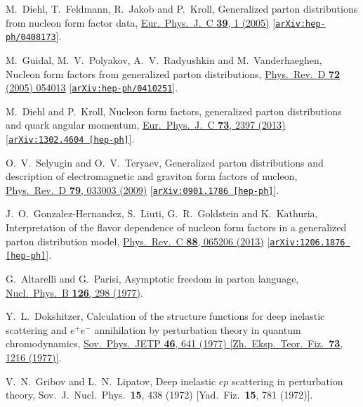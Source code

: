 \documentclass[aps,prl,reprint,groupedaddress, preprintnumbers]{revtex4-1}
\begin{document}
\begin{thebibliography}{50}
  
  M.~Diehl, T.~Feldmann, R.~Jakob and P.~Kroll,
  Generalized parton distributions from nucleon form factor data,
  \href{https://doi.org/10.1140/epjc/s2004-02063-4}{Eur.\ Phys.\ J.\ C {\bf 39}, 1 (2005)}
  [\href{https://arxiv.org/abs/hep-ph/0408173}{\tt arXiv:hep-ph/0408173}].  
  
  
  M.~Guidal, M.~V.~Polyakov, A.~V.~Radyushkin and M.~Vanderhaeghen,
  Nucleon form factors from generalized parton distributions,
  \href{https://doi.org/10.1103/PhysRevD.72.054013}{Phys.\ Rev.\ D {\bf 72} (2005) 054013}
  [\href{https://arxiv.org/abs/hep-ph/0410251}{\tt arXiv:hep-ph/0410251}].
  
  
  M.~Diehl and P.~Kroll,
  Nucleon form factors, generalized parton distributions and quark angular momentum,
  \href{https://doi.org/10.1140/epjc/s2004-02063-4}{Eur.\ Phys.\ J.\ C {\bf 73}, 2397 (2013)}
  [\href{https://arxiv.org/abs/1302.4604}{\tt arXiv:1302.4604 [hep-ph]}].


  O.~V.~Selyugin and O.~V.~Teryaev,
  Generalized parton distributions and description of electromagnetic and graviton form factors of nucleon,
  \href{https://doi.org/10.1103/PhysRevD.79.033003}{Phys.\ Rev.\ D {\bf 79}, 033003 (2009)}
  [\href{https://arxiv.org/abs/0901.1786}{\tt arXiv:0901.1786 [hep-ph]}].  
  

  J.~O.~Gonzalez-Hernandez, S.~Liuti, G.~R.~Goldstein and K.~Kathuria,
  Interpretation of the flavor dependence of nucleon form factors in a generalized parton distribution model,
  \href{https://doi.org/10.1103/PhysRevC.88.065206}{Phys.\ Rev.\ C {\bf 88},  065206 (2013)}
  [\href{https://arxiv.org/abs/1206.1876}{\tt arXiv:1206.1876 [hep-ph]}].  
  
 
  G.~Altarelli and G.~Parisi,
  Asymptotic freedom in parton language,
  \href{https://doi.org/10.1016/0550-3213(77)90384-4}{Nucl.\ Phys.\ B {\bf 126}, 298 (1977)}.


  Y.~L.~Dokshitzer,
  Calculation of the structure functions for deep inelastic scattering and $e^+ e^-$ annihilation by perturbation theory in quantum chromodynamics,
  \href{http://www.jetp.ac.ru/cgi-bin/e/index/e/46/4/p641?a=list}{Sov.\ Phys.\ JETP {\bf 46}, 641 (1977)
  [Zh.\ Eksp.\ Teor.\ Fiz.\  {\bf 73}, 1216 (1977)]}.

  
  V.~N.~Gribov and L.~N.~Lipatov,
  Deep inelastic $e p$  scattering in perturbation theory,
  Sov.\ J.\ Nucl.\ Phys.\  {\bf 15}, 438 (1972)
  [Yad.\ Fiz.\  {\bf 15}, 781 (1972)].


\end{thebibliography}
\end{document}
